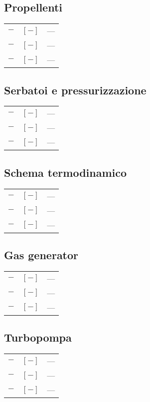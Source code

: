 \begin{multicols}{2}
	\subsection{Propellenti}
	\begin{tabularx}{\linewidth}{ccX}
		$\bm{-}$ & $[-]$ & --- \\
		$\bm{-}$ & $[-]$ & --- \\
		$\bm{-}$ & $[-]$ & ---
	\end{tabularx}

	\subsection{Serbatoi e pressurizzazione}
	\begin{tabularx}{\linewidth}{ccX}
		$\bm{-}$ & $[-]$ & --- \\
		$\bm{-}$ & $[-]$ & --- \\
		$\bm{-}$ & $[-]$ & ---
	\end{tabularx}

	\subsection{Schema termodinamico}
	\begin{tabularx}{\linewidth}{ccX}
		$\bm{-}$ & $[-]$ & --- \\
		$\bm{-}$ & $[-]$ & --- \\
		$\bm{-}$ & $[-]$ & ---
	\end{tabularx}

	\subsection{Gas generator}
	\begin{tabularx}{\linewidth}{ccX}
		$\bm{-}$ & $[-]$ & --- \\
		$\bm{-}$ & $[-]$ & --- \\
		$\bm{-}$ & $[-]$ & ---
	\end{tabularx}
	
	\subsection{Turbopompa}
	\begin{tabularx}{\linewidth}{ccX}
		$\bm{-}$ & $[-]$ & --- \\
		$\bm{-}$ & $[-]$ & --- \\
		$\bm{-}$ & $[-]$ & ---
	\end{tabularx}


\end{multicols}
